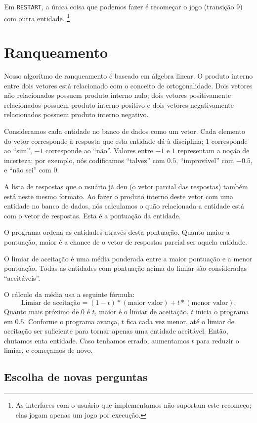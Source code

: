 \documentclass{article}
\newcommand{\restart}{\lstinline"RESTART"}
\begin{document}
Em \restart, a única coisa que podemos fazer é recomeçar o jogo
(transição 9)
com outra entidade.
\footnote{
    As interfaces com o usuário que implementamos
    não suportam este recomeço;
    elas jogam apenas um jogo por execução.
}

\section{Ranqueamento \label{ranqueamento}}

Nosso algoritmo de ranqueamento é baseado em álgebra linear.
O produto interno entre dois vetores está relacionado com o conceito de ortogonalidade.
Dois vetores não relacionados possuem produto interno nulo;
dois vetores positivamente relacionados possuem produto interno positivo
e dois vetores negativamente relacionados possuem produto interno negativo.

Consideramos cada entidade no banco de dados como um vetor.
Cada elemento do vetor corresponde à resposta que esta entidade dá à disciplina;
$1$ corresponde ao ``sim'', $-1$ corresponde ao ``não''.
Valores entre $-1$ e $1$ representam a noção de incerteza;
por exemplo, nós codificamos ``talvez'' com $0.5$,
``improvável'' com $-0.5$, e ``não sei'' com $0$.

A lista de respostas que o usuário já deu
(o vetor parcial das respostas)
também está neste mesmo formato.
Ao fazer o produto interno deste vetor com uma entidade no banco de dados,
nós calculamos o quão relacionada a entidade está com o vetor de respostas.
Esta é a pontuação da entidade.

O programa ordena as entidades através desta pontuação.
Quanto maior a pontuação, maior é a chance de o vetor de respostas parcial
ser aquela entidade.

O limiar de aceitação é uma média ponderada entre a maior pontuação
e a menor pontuação.
Todas as entidades com pontuação acima do limiar são consideradas
``aceitáveis''.

O cálculo da média usa a seguinte fórmula:
\begin{equation}
    \text{Limiar de aceitação} =
    (1-t) * (\text{maior valor}) + t * (\text{menor valor}).
\end{equation}
Quanto mais próximo de $0$ é $t$, maior é o limiar de aceitação.
$t$ inicia o programa em $0.5$.
Conforme o programa avança,
$t$ fica cada vez menor,
até o limiar de aceitação ser suficiente para tornar apenas uma entidade aceitável.
Então, chutamos enta entidade.
Caso tenhamos errado, aumentamos $t$ para reduzir o limiar,
e começamos de novo.

\subsection{Escolha de novas perguntas}
\end{document}
